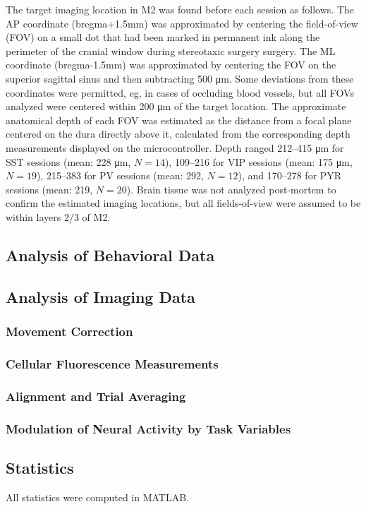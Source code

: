 {The target imaging location in M2 was found before each session as follows. The AP coordinate (bregma+1.5mm) was approximated by centering the field-of-view (FOV) on a small dot that had been marked in permanent ink along the perimeter of the cranial window during stereotaxic surgery surgery. The ML coordinate (bregma-1.5mm) was approximated by centering the FOV on the superior sagittal sinus and then subtracting 500 \si{\um}. Some deviations from these coordinates were permitted, eg, in cases of occluding blood vessels, but all FOVs analyzed were centered within 200 \si{\um} of the target location. The approximate anatomical depth of each FOV was estimated as the distance from a focal plane centered on the dura directly above it, calculated from the corresponding depth measurements displayed on the microcontroller. Depth ranged 212--415 \si{\um} for SST sessions (mean: 228 \si{\um}, $N=14$), 109--216 for VIP sessions (mean: 175 \si{\um}, $N=19$), 215--383 for PV sessions (mean: 292, $N=12$), and 170--278 for PYR sessions (mean: 219, $N=20$). Brain tissue was not analyzed post-mortem to confirm the estimated imaging locations, but all fields-of-view were assumed to be within layers 2/3 of M2.

\subsection*{Analysis of Behavioral Data}
\subsection*{Analysis of Imaging Data}
\subsubsection*{Movement Correction}
\subsubsection*{Cellular Fluorescence Measurements}
\subsubsection*{Alignment and Trial Averaging}
\subsubsection*{Modulation of Neural Activity by Task Variables}

\subsection*{Statistics}
All statistics were computed in MATLAB.

}

